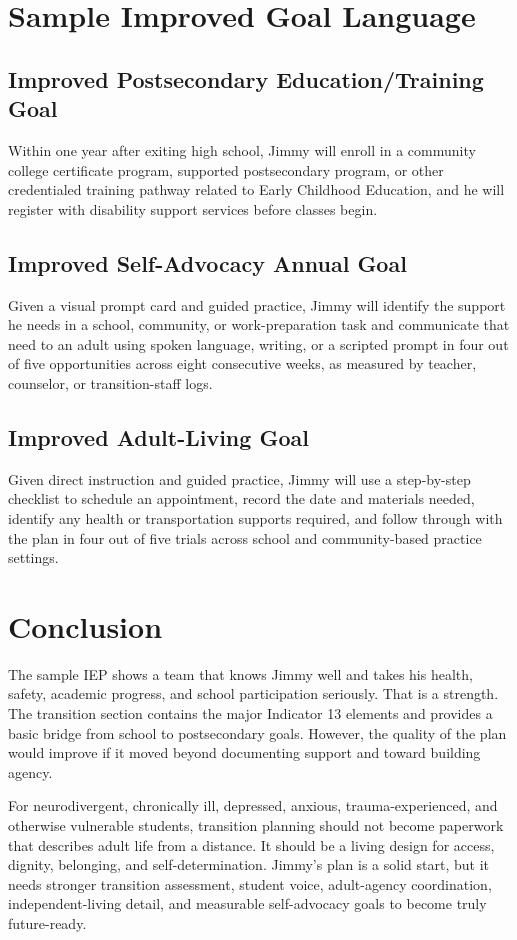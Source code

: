 \section*{Sample Improved Goal Language}

\subsection*{Improved Postsecondary Education/Training Goal}

Within one year after exiting high school, Jimmy will enroll in a community college certificate program, supported postsecondary program, or other credentialed training pathway related to Early Childhood Education, and he will register with disability support services before classes begin.

\subsection*{Improved Self-Advocacy Annual Goal}

Given a visual prompt card and guided practice, Jimmy will identify the support he needs in a school, community, or work-preparation task and communicate that need to an adult using spoken language, writing, or a scripted prompt in four out of five opportunities across eight consecutive weeks, as measured by teacher, counselor, or transition-staff logs.

\subsection*{Improved Adult-Living Goal}

Given direct instruction and guided practice, Jimmy will use a step-by-step checklist to schedule an appointment, record the date and materials needed, identify any health or transportation supports required, and follow through with the plan in four out of five trials across school and community-based practice settings.

\section*{Conclusion}

The sample IEP shows a team that knows Jimmy well and takes his health, safety, academic progress, and school participation seriously. That is a strength. The transition section contains the major Indicator 13 elements and provides a basic bridge from school to postsecondary goals. However, the quality of the plan would improve if it moved beyond documenting support and toward building agency.

For neurodivergent, chronically ill, depressed, anxious, trauma-experienced, and otherwise vulnerable students, transition planning should not become paperwork that describes adult life from a distance. It should be a living design for access, dignity, belonging, and self-determination. Jimmy's plan is a solid start, but it needs stronger transition assessment, student voice, adult-agency coordination, independent-living detail, and measurable self-advocacy goals to become truly future-ready.
